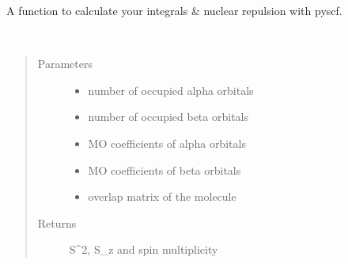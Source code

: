 \documentclass[letterpaper,10pt,english]{sphinxmanual}
\begin{document}

\begin{fulllineitems}
\label{\detokenize{SCF_functions:ghf.SCF_functions.get_integrals_pyscf}}
A function to calculate your integrals \& nuclear repulsion with pyscf.

\end{fulllineitems}


\begin{fulllineitems}
\label{\detokenize{SCF_functions:ghf.SCF_functions.spin}}~\begin{quote}\begin{description}
\item[{Parameters}] \leavevmode\begin{itemize}
\item {} 
 \textendash{} number of occupied alpha orbitals

\item {} 
 \textendash{} number of occupied beta orbitals

\item {} 
 \textendash{} MO coefficients of alpha orbitals

\item {} 
 \textendash{} MO coefficients of beta orbitals

\item {} 
 \textendash{} overlap matrix of the molecule

\end{itemize}

\item[{Returns}] \leavevmode
S\textasciicircum{}2, S\_z and spin multiplicity

\end{description}\end{quote}

\end{fulllineitems}
\end{document}
